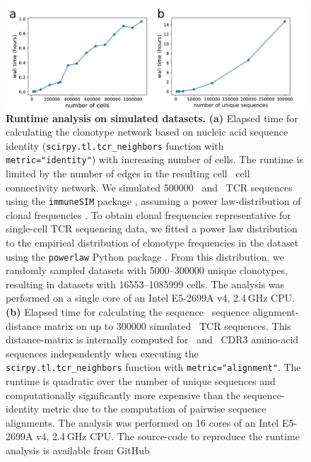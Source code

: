 \documentclass{article}
\begin{document}
\newpage
\begin{figure}[!ht]
  \centering
  \includegraphics[width=7in]{../figures/runtime.pdf}
  \caption{
    \textbf{Runtime analysis on simulated datasets.}
    \textbf{(a)} Elapsed time for calculating the clonotype network based on nucleic acid sequence identity 
    (\texttt{scirpy.tl.tcr\_neighbors} function with \texttt{metric="identity"}) with increasing number of cells. 
    The runtime is limited by the number of edges in the resulting cell \texttimes\ cell connectivity network.
    We simulated \num{500000} \textalpha\ and \textbeta\ TCR sequences using the \texttt{immuneSIM} package \cite{Weber2020}, 
    assuming a power law-distribution of clonal frequencies \cite{Greiff2015, Weber2020}.
    To obtain clonal frequencies representative for single-cell TCR sequencing data, we fitted a power law distribution
    to the empirical distribution of clonotype frequencies in the \textcite{Wu2020-vp} dataset using the \texttt{powerlaw}
    Python package \cite{Alstott2014}. From this distribution, we randomly sampled datasets with 
    \SIrange{5000}{300000}{} unique clonotypes, resulting in datasets with \SIrange{16553}{1085999}{} cells. 
    The analysis was performed on a single core of an Intel E5-2699A v4, 2.4 GHz CPU. 
    \textbf{(b)} Elapsed time for calculating the sequence  \texttimes\ sequence alignment-distance matrix on up to \num{300000} simulated \textalpha\ TCR sequences.
    This distance-matrix is internally computed for \textalpha\ and \textbeta\ CDR3 amino-acid sequences independently when executing the 
    \texttt{scirpy.tl.tcr\_neighbors} function with \texttt{metric="alignment"}. The runtime is quadratic over 
    the number of unique sequences and computationally significantly more expensive than the sequence-identity
    metric due to the computation of pairwise sequence alignments. The analysis was performed on 16 cores of an Intel E5-2699A v4, 2.4 GHz CPU. 
    The source-code to reproduce the runtime analysis is available from GitHub\protect\footnotemark
    }
\end{figure}
\end{document}
